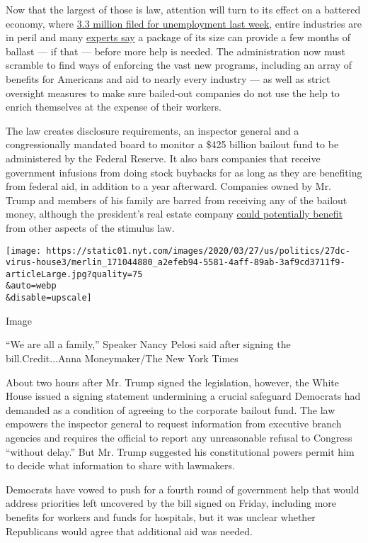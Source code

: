 Now that the largest of those is law, attention will turn to its effect
on a battered economy, where
\href{https://www.nytimes.com/2020/03/26/business/economy/coronavirus-unemployment-claims.html}{3.3
million filed for unemployment last week}, entire industries are in
peril and many
\href{https://www.nytimes.com/2020/03/25/business/2-trillion-stimulus-coronavirus-bill.html}{experts
say} a package of its size can provide a few months of ballast --- if
that --- before more help is needed. The administration now must
scramble to find ways of enforcing the vast new programs, including an
array of benefits for Americans and aid to nearly every industry --- as
well as strict oversight measures to make sure bailed-out companies do
not use the help to enrich themselves at the expense of their workers.

The law creates disclosure requirements, an inspector general and a
congressionally mandated board to monitor a \$425 billion bailout fund
to be administered by the Federal Reserve. It also bars companies that
receive government infusions from doing stock buybacks for as long as
they are benefiting from federal aid, in addition to a year afterward.
Companies owned by Mr. Trump and members of his family are barred from
receiving any of the bailout money, although the president's real estate
company
\href{https://www.nytimes.com/2020/03/25/us/politics/virus-fineprint-stimulus-bill.html}{could
potentially benefit} from other aspects of the stimulus law.

\texttt{[image: https://static01.nyt.com/images/2020/03/27/us/politics/27dc-virus-house3/merlin\_171044880\_a2efeb94-5581-4aff-89ab-3af9cd3711f9-articleLarge.jpg?quality=75\\\&auto=webp\\\&disable=upscale]}

Image

``We are all a family,'' Speaker Nancy Pelosi said after signing the
bill.Credit...Anna Moneymaker/The New York Times

About two hours after Mr. Trump signed the legislation, however, the
White House issued a signing statement undermining a crucial safeguard
Democrats had demanded as a condition of agreeing to the corporate
bailout fund. The law empowers the inspector general to request
information from executive branch agencies and requires the official to
report any unreasonable refusal to Congress ``without delay.'' But Mr.
Trump suggested his constitutional powers permit him to decide what
information to share with lawmakers.

Democrats have vowed to push for a fourth round of government help that
would address priorities left uncovered by the bill signed on Friday,
including more benefits for workers and funds for hospitals, but it was
unclear whether Republicans would agree that additional aid was needed.

